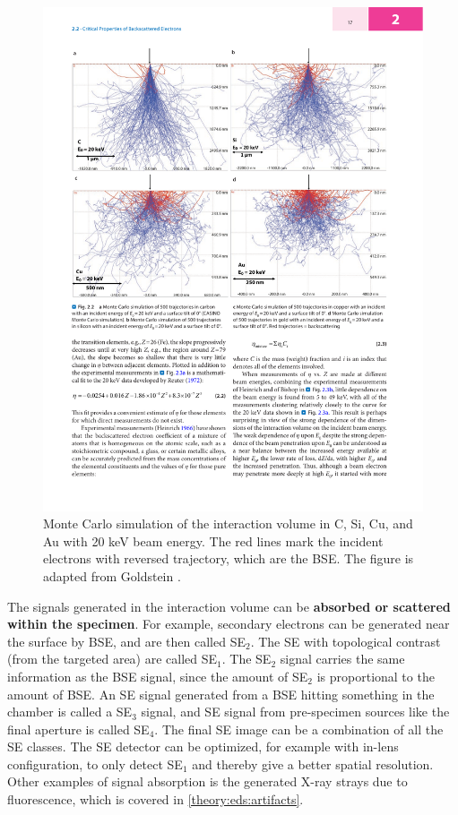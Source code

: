 \begin{figure}[ht]
    \centering
    \includegraphics[width=0.8\linewidth]{figures/SEM_montecarlo_BSE.pdf}
    \caption{
        Monte Carlo simulation of the interaction volume in C, Si, Cu, and Au with 20 keV beam energy.
        The red lines mark the incident electrons with reversed trajectory, which are the BSE.
        The figure is adapted from Goldstein \cite[Fig. 2.2]{goldstein_scanning_2018}.
    }
    \label{fig:montecarlo_BSE}
\end{figure}


The signals generated in the interaction volume can be \textbf{absorbed or scattered within the specimen}.
For example, secondary electrons can be generated near the surface by BSE, and are then called SE$_2$.
The SE with topological contrast (from the targeted area) are called SE$_1$.
The SE$_2$ signal carries the same information as the BSE signal, since the amount of SE$_2$ is proportional to the amount of BSE.
An SE signal generated from a BSE hitting something in the chamber is called a SE$_3$ signal, and SE signal from pre-specimen sources like the final aperture is called SE$_4$.
The final SE image can be a combination of all the SE classes.
The SE detector can be optimized, for example with  in-lens configuration, to only detect SE$_1$ and thereby give a better spatial resolution.
Other examples of signal absorption is the generated X-ray strays due to fluorescence, which is covered in \cref{theory:eds:artifacts}.


